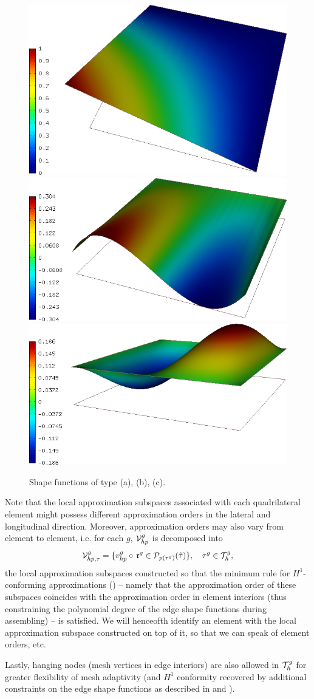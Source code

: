 \begin{figure}[!hb]
  \centering
  \includegraphics[width=.32\textwidth]{vtx}\hspace{.01\textwidth}
  \includegraphics[width=.32\textwidth]{face}\hspace{.01\textwidth}
  \includegraphics[width=.32\textwidth]{bubble}
  \caption{Shape functions of type (a), (b), (c).}
 	\label{fig:bazep}
\end{figure}

Note that the local approximation subspaces associated with each quadrilateral element might possess different
approximation orders in the lateral and longitudinal direction. Moreover, approximation orders may also vary from
element to element, i.e. for each $g$, $\mathcal{V}_{hp}^g$ is decomposed into
\begin{equation}\label{eq:hermes_space}
	\mathcal{V}_{hp,\tau}^g = \{v_{hp}^g \circ\, \mathfrak{r}^g \in
	\mathcal{P}_{p(\tau^g)}(\hat{\tau})
	\},\quad \tau^g\in\mathcal{T}_{h}^g,
\end{equation}
the local approximation subspaces constructed so that the minimum rule for $H^1$-conforming approximations
(\cite[\S3.5.5]{Hermes-book1}) -- namely that the approximation order of these subspaces coincides with the
approximation order in element interiors (thus constraining the polynomial degree of the edge shape functions during
assembling) -- is satisfied. We will henceofth identify an element with the local approximation subspace
constructed on top of it, so that we can speak of element orders, etc.

Lastly, hanging nodes (mesh vertices in edge interiors) are also
allowed in $\mathcal{T}_{h}^g$ for greater flexibility of mesh adaptivity (and $H^1$ conformity recovered by additional constraints on the edge shape functions as
described in \cite[\S3.6]{Hermes-book1} and \cite{Hermes-hanging-nodes}).

